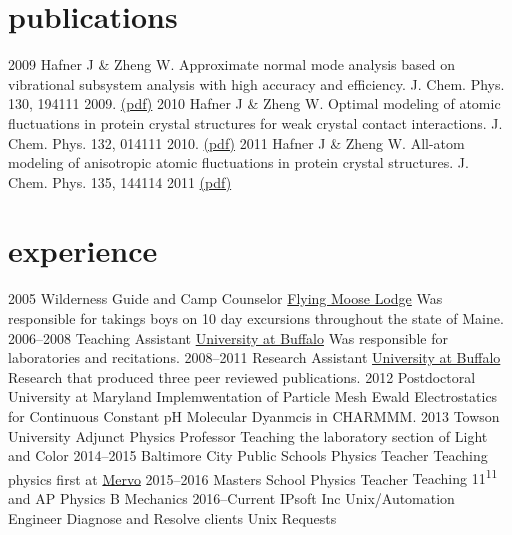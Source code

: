 \documentclass[]{twentysecondcv}
\begin{document}
\section{publications}

\begin{twentyshort}
  \twentyitemshort
     {2009}
     {Hafner J \& Zheng W. Approximate normal mode analysis based on vibrational subsystem analysis with high accuracy and efficiency. J. Chem. Phys. 130, 194111 2009.  \href{http://www.acsu.buffalo.edu/~wjzheng/Hafner_jcp2009.pdf}{(pdf)}}
  \twentyitemshort
     {2010}
     {Hafner J \& Zheng W. Optimal modeling of atomic fluctuations in protein crystal structures for weak crystal contact interactions. J. Chem. Phys. 132, 014111 2010. \href{http://www.acsu.buffalo.edu/~wjzheng/Hafner_jcp2010.pdf}{(pdf)}}
  \twentyitemshort
     {2011}
     {Hafner J \& Zheng W. All-atom modeling of anisotropic atomic fluctuations in protein crystal structures. J. Chem. Phys. 135, 144114 2011 \href{http://www.acsu.buffalo.edu/\~{}wjzheng/Hafner_jcp2011.pdf}{(pdf)}}
\end{twentyshort}



\section{experience}

\begin{twenty}
  \twentyitem
    {2005}
    {Wilderness Guide and Camp Counselor}
    {\href{www.flyingmooselodge.com}{Flying Moose Lodge}}
    {Was responsible for takings boys on 10 day excursions throughout the state of Maine.}
  \twentyitem
    {2006--2008}
    {Teaching Assistant}
    {\href{www.andrews.edu}{University at Buffalo}}
    {Was responsible for laboratories and recitations.}
  \twentyitem
    {2008--2011}
    {Research Assistant}
    {\href{www.buffalo.edu}{University at Buffalo}}
    {Research that produced three peer reviewed publications.}
  \twentyitem
    {2012}
    {Postdoctoral}
    {University at Maryland}
    {Implemwentation of Particle Mesh Ewald Electrostatics for Continuous Constant pH Molecular Dyanmcis in CHARMMM.}
\twentyitem
    {2013}
    {Towson University}
    {Adjunct Physics Professor}
    {Teaching the laboratory section of Light and Color}
\twentyitem
    {2014--2015}
    {Baltimore City Public Schools}
    {Physics Teacher}
    {Teaching physics first at \href{http://mervo.org}{Mervo}}
\twentyitem
    {2015--2016}
    {Masters School}
    {Physics Teacher}
    {Teaching 11\textsuperscript{11} and AP Physics B Mechanics}
\twentyitem
    {2016--Current}
    {IPsoft Inc}
    {Unix/Automation Engineer}
    {Diagnose and Resolve clients Unix Requests}
\end{twenty}
\end{document}
